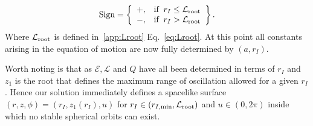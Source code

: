 \documentclass[12pt, amsmath]{revtex4-2}
\newcommand\EN{\mathcal{E}}
\newcommand\ANG{\mathcal{L}}
\begin{document}
\begin{equation}
\text{Sign} = 
\left\{
    \begin{array}{lr}
         + , & \text{if}\;\; r_I \leq \ANG_{\rm root}\\
         - , & \text{if}\;\; r_I > \ANG_{\rm root}
    \end{array}\right\}.
\end{equation}
Where $\ANG_{\rm root}$ is defined in~\ref{app:Lroot} Eq.~\eqref{eq:Lroot}. At this point all constants arising in the equation of motion are now fully determined by $(a,r_I)$.

Worth noting is that as $\EN, \ANG$ and $Q$ have all been determined in terms of $r_I$ and $z_1$ is the root that defines the maximum range of oscillation allowed for a given $r_I$. Hence our solution immediately defines a spacelike surface $(r,z,\phi) = (r_I,z_1(r_I), u)$ for $r_I \in (r_{I,\rm min}, \ANG_{\rm root})$ and $u\in(0,2\pi)$ inside which no stable spherical orbits can exist.
 
\end{document}
